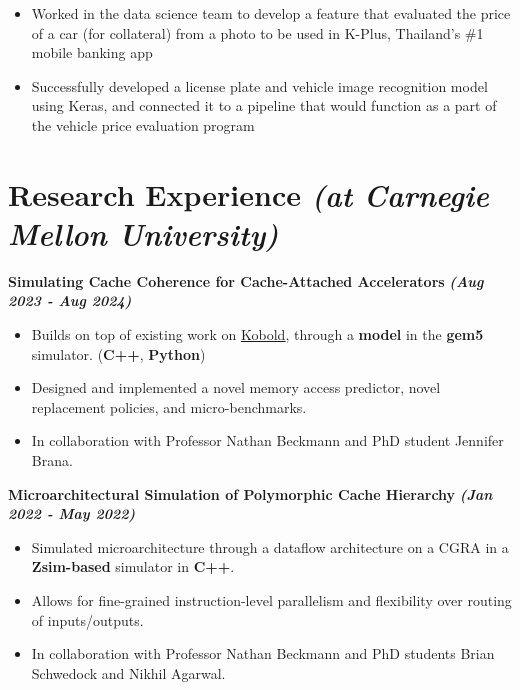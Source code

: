 \documentclass[10pt]{article}
\begin{document}
  \vspace*{-0.2cm}
  \begin{itemize}
    \itemsep-0.4em
    \item \textcolor{lighterG}{Worked in the data science team to develop a feature that evaluated the price of a car (for collateral) from a photo to be used in K-Plus, Thailand's \#1 mobile banking app}
    \item \textcolor{lighterG}{Successfully developed a license plate and vehicle image recognition model using Keras, and connected it to a pipeline that would function as a part of the vehicle price evaluation program}
  \end{itemize}


    \section*{{\Large \textcolor{lighterB}{Research Experience}} {\normalsize \textit{\textcolor{lighterB}{(at Carnegie Mellon University)}}}}

  \textbf{\large Simulating Cache Coherence for Cache-Attached Accelerators} {\hfill \textit{\textbf{(Aug 2023 - Aug 2024)}}}
  \vspace*{-0.17cm}
  \begin{itemize}
    \itemsep0em
    \item \textcolor{lighterG}{Builds on top of existing work on \href{https://ieeexplore.ieee.org/document/10106564}{\underline{Kobold}}, through a \textbf{model} in the \textbf{gem5} simulator. (\textbf{C++}, \textbf{Python})}
    \item \textcolor{lighterG}{Designed and implemented a novel memory access predictor,
        novel replacement policies, and micro-benchmarks.}
    \item \textcolor{lighterG}{In collaboration with Professor Nathan Beckmann and PhD student Jennifer Brana.}
  \end{itemize}

  \textbf{\large Microarchitectural Simulation of Polymorphic Cache Hierarchy} {\hfill \textit{\textbf{(Jan 2022 - May 2022)}}}
  \vspace*{-0.17cm}
  \begin{itemize}
    \itemsep0em
    \item \textcolor{lighterG}{Simulated microarchitecture through a dataflow architecture on a CGRA in a \textbf{Zsim-based} simulator in \textbf{C++}.}
    \item \textcolor{lighterG}{Allows for fine-grained instruction-level parallelism and flexibility over routing of inputs/outputs.}
    \item \textcolor{lighterG}{In collaboration with Professor Nathan Beckmann and PhD students Brian Schwedock and Nikhil Agarwal.}
  \end{itemize}
\end{document}
